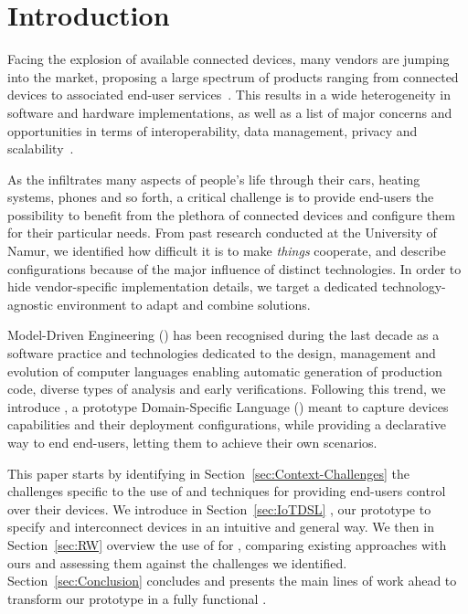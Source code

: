 \section{Introduction}
\label{sec:Introduction}

Facing the explosion of available connected devices, many vendors are jumping into the market, proposing a large spectrum of products ranging from connected devices to associated end-user services~\cite{lee-15}. This results in a wide heterogeneity in software and hardware implementations, as well as a list of major concerns and opportunities in terms of interoperability, data management, privacy and scalability~\cite{chaqfeh-12}.

As the \IOT infiltrates many aspects of people's life through their cars, heating systems, phones and so forth, a critical challenge is to provide end-users the possibility to benefit from the plethora of connected devices and configure them for their particular needs. From past research conducted at the University of Namur, we identified how difficult it is to make \textit{things} cooperate, and describe configurations because of the major influence of distinct technologies. In order to hide vendor-specific implementation details, we target a dedicated technology-agnostic environment to adapt and combine \IOT solutions.

Model-Driven Engineering (\MDE) has been recognised during the last decade as a software practice and technologies dedicated to the design, management and evolution of computer languages enabling automatic generation of production code, diverse types of analysis and early verifications. Following this trend, we introduce \IOTDSL, a prototype Domain-Specific Language (\DSL) meant to capture \IOT devices capabilities and their deployment configurations, while providing a declarative way to end end-users, letting them to achieve their own scenarios.

This paper starts by identifying in Section~\ref{sec:Context-Challenges} the \IOT challenges specific to the use of \DSLS and \MDE techniques for providing end-users control over their devices. We introduce in Section~\ref{sec:IoTDSL} \IOTDSL, our prototype \DSL to specify and interconnect devices in an intuitive and general way. We then in Section~\ref{sec:RW} overview the use of \DSLS for \IOT, comparing existing approaches with ours and assessing them against the challenges we identified. Section~\ref{sec:Conclusion} concludes and presents the main lines of work ahead to transform our prototype in a fully functional \DSL.